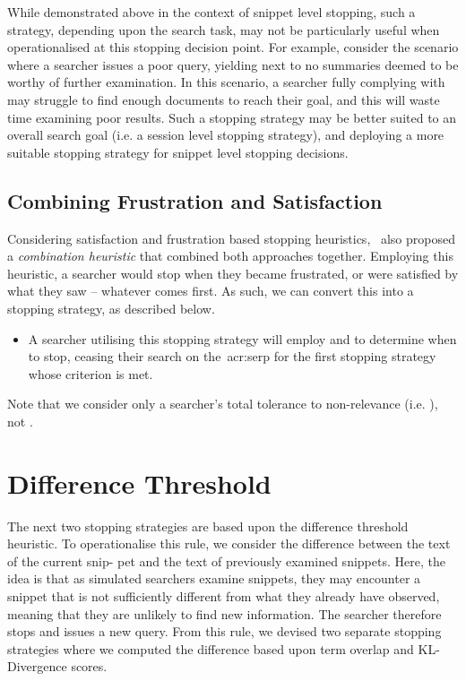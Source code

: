 While demonstrated above in the context of snippet level stopping, such a strategy, depending upon the search task, may not be particularly useful when operationalised at this stopping decision point. For example, consider the scenario where a searcher issues a poor query, yielding next to no summaries deemed to be worthy of further examination. In this scenario, a searcher fully complying with  may struggle to find enough documents to reach their goal, and this will waste time examining poor results. Such a stopping strategy may be better suited to an overall search goal (i.e. a session level stopping strategy), and deploying a more suitable stopping strategy for snippet level stopping decisions.


\subsection{Combining Frustration and Satisfaction}
Considering satisfaction and frustration based stopping heuristics,~\citealt{kraft1979stopping_rules} also proposed a \emph{combination heuristic} that combined both approaches together. Employing this heuristic, a searcher would stop when they became frustrated, or were satisfied by what they saw -- whatever comes first. As such, we can convert this into a stopping strategy, as described below.

\begin{itemize}
    \item[\blueboxbold{SS5}] A searcher utilising this stopping strategy will employ  and  to determine when to stop, ceasing their search on the~\gls{acr:serp} for the first stopping strategy whose criterion is met.
\end{itemize}

Note that we consider only a searcher's total tolerance to non-relevance (i.e. ), not .


\section{Difference Threshold}
The next two stopping strategies are based upon the difference threshold heuristic. To operationalise this rule, we consider the difference between the text of the current snip- pet and the text of previously examined snippets. Here, the idea is that as simulated searchers examine snippets, they may encounter a snippet that is not sufficiently different from what they already have observed, meaning that they are unlikely to find new information. The searcher therefore stops and issues a new query. From this rule, we devised two separate stopping strategies where we computed the difference based upon term overlap and KL-Divergence scores.

